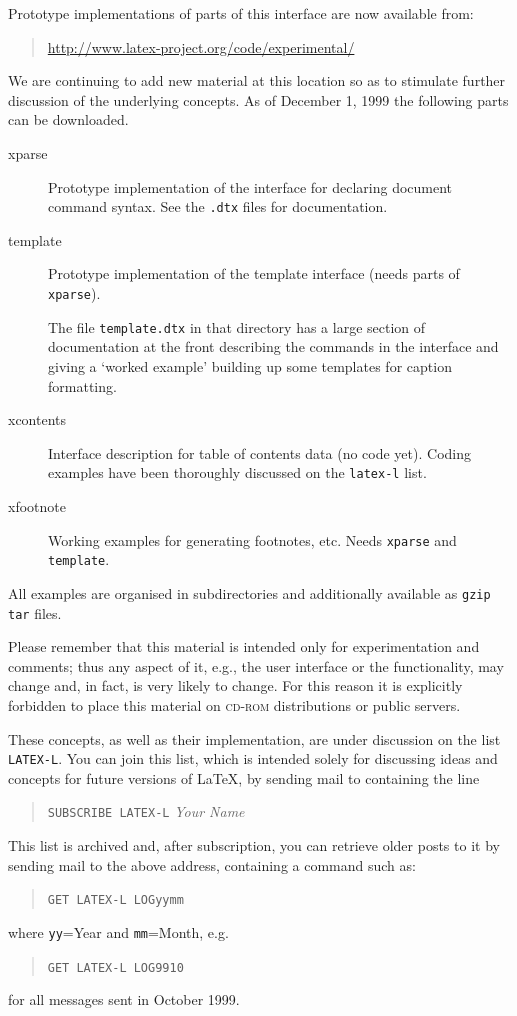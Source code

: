 \documentclass{ltnews}
\providecommand{\acro}[1]{\textsc{\MakeLowercase{#1}}}
\providecommand\pkg[1]{\texttt{#1}}
\providecommand\file[1]{\texttt{#1}}
\begin{document}
Prototype implementations of parts of this interface are now available from:
\begin{quote}
   \url{http://www.latex-project.org/code/experimental/}
\end{quote}

We are continuing to add new material at this location so as to
stimulate further discussion of the underlying concepts. As of
December 1, 1999
the following parts can be downloaded.
\begin{description}

 \item[xparse] Prototype implementation of the interface for declaring
  document command syntax. See the \texttt{.dtx} files for
  documentation.

 \item[template] Prototype implementation of the template interface
  (needs parts of \pkg{xparse}).

  The file \file{template.dtx} in that directory has a large section
  of documentation at the front describing the commands in the
  interface and giving a `worked example' building up some templates
  for caption formatting.

 \item[xcontents] Interface description for table of contents data (no
  code yet).  Coding examples have been thoroughly discussed on the
  \texttt{latex-l} list.

 \item[xfootnote] Working examples for generating footnotes,
  etc. Needs \pkg{xparse} and \pkg{template}.

 \end{description}
All examples are organised in subdirectories and additionally
 available as \texttt{gzip} \texttt{tar} files.

 Please remember
that this material is intended only for experimentation and comments;
thus any aspect of it, e.g., the user interface or the functionality,
may change and, in fact, is very likely to change.
For this reason it is explicitly forbidden to place this material on
\acro{CD-ROM} distributions or public servers.

These concepts, as well as their implementation, are under discussion
on the list \texttt{LATEX-L}. You can join this list, which is
intended solely for discussing ideas and concepts for future versions
of \LaTeX, by sending mail to
containing the line
  \begin{quote}
    \texttt{SUBSCRIBE LATEX-L} \textit{Your Name}
  \end{quote}

This list is archived and, after subscription, you can retrieve older
posts to it by sending mail to the above address, containing a command
such as:
\begin{quote}
\texttt{GET LATEX-L LOGyymm}
\end{quote}
where \texttt{yy}=Year and \texttt{mm}=Month, e.g.
\begin{quote}
\texttt{GET LATEX-L LOG9910}
\end{quote}
for all messages sent in October 1999.
\end{document}
